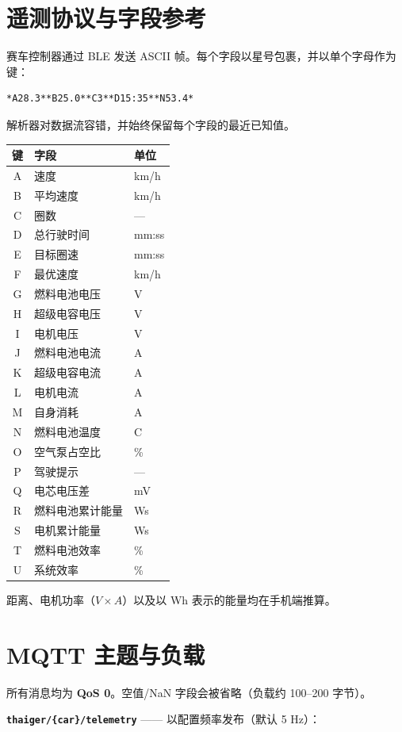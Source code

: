 \documentclass[11pt,a4paper,oneside]{report}
\newcommand{\degC}{\textdegree C}
\newcommand{\code}[1]{\texttt{#1}}
\begin{document}
\section{遥测协议与字段参考}
赛车控制器通过 BLE 发送 ASCII 帧。每个字段以星号包裹，并以单个字母作为键：

\begin{lstlisting}
*A28.3**B25.0**C3**D15:35**N53.4*
\end{lstlisting}
解析器对数据流容错，并始终保留每个字段的最近已知值。

\begin{tabularx}{\linewidth}{@{}clL@{}}
\toprule
\textbf{键} & \textbf{字段} & \textbf{单位}\\
\midrule
A & 速度 & km/h\\
B & 平均速度 & km/h\\
C & 圈数 & ---\\
D & 总行驶时间 & mm:ss\\
E & 目标圈速 & mm:ss\\
F & 最优速度 & km/h\\
G & 燃料电池电压 & V\\
H & 超级电容电压 & V\\
I & 电机电压 & V\\
J & 燃料电池电流 & A\\
K & 超级电容电流 & A\\
L & 电机电流 & A\\
M & 自身消耗 & A\\
N & 燃料电池温度 & \degC{}\\
O & 空气泵占空比 & \%\\
P & 驾驶提示 & ---\\
Q & 电芯电压差 & mV\\
R & 燃料电池累计能量 & Ws\\
S & 电机累计能量 & Ws\\
T & 燃料电池效率 & \%\\
U & 系统效率 & \%\\
\bottomrule
\end{tabularx}

\medskip
距离、电机功率（$V \times A$）以及以 Wh 表示的能量均在手机端推算。

\section{MQTT 主题与负载}
所有消息均为 \textbf{QoS 0}。空值/NaN 字段会被省略（负载约 100--200 字节）。

\noindent\textbf{\code{thaiger/\{car\}/telemetry}} —— 以配置频率发布（默认 5 Hz）：
\end{document}
